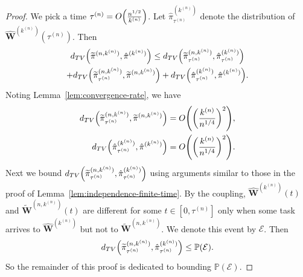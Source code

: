\documentclass[sigconf]{acmart}
\renewcommand{\Pr}{\mathbb{P}} %
\newcommand{\supn}{^{(n)}}
\begin{document}
\begin{proof}
We pick a time $\tau\supn=O\Bigl(\frac{n^{1/2}}{k\supn}\Bigr)$. Let $\hat{\pi}^{(k\supn)}_{\tau\supn}$ denote the distribution of $\hat{\bm{W}}^{(k\supn)}(\tau\supn)$.  Then
\begin{multline*}
d_{TV}\Bigl(\widetilde{\pi}^{(n,k\supn)},\hat{\pi}^{(k\supn)}\Bigr)\le d_{TV}\Bigl(\widetilde{\pi}^{(n,k\supn)}_{\tau\supn},\hat{\pi}^{(k\supn)}_{\tau\supn}\Bigr)\\
+ d_{TV}\Bigl(\widetilde{\pi}^{(n,k\supn)}_{\tau\supn},\widetilde{\pi}^{(n,k\supn)}\Bigr)+d_{TV}\Bigl(\hat{\pi}^{(k\supn)}_{\tau\supn},\hat{\pi}^{(k\supn)}\Bigr).
\end{multline*}
Noting Lemma~\ref{lem:convergence-rate}, we have
\begin{align}
d_{TV}\Bigl(\widetilde{\pi}_{\tau\supn}^{(n,k\supn)},\widetilde{\pi}^{(n,k\supn)}\Bigr)&=O\Biggl(\biggl(\frac{k\supn}{n^{1/4}}\biggr)^2\Biggr),\label{eq:dis1}\\
d_{TV}\Bigl(\hat{\pi}_{\tau\supn}^{(k\supn)},\hat{\pi}^{(k\supn)}\Bigr)&=O\Biggl(\biggl(\frac{k\supn}{n^{1/4}}\biggr)^2\Biggr).\label{eq:dis2}
\end{align}
Next we bound $d_{TV}\Bigl(\widetilde{\pi}^{(n,k\supn)}_{\tau\supn},\hat{\pi}^{(k\supn)}_{\tau\supn}\Bigr)$ using arguments similar to those in the proof of Lemma~\ref{lem:independence-finite-time}. By the coupling, $\hat{\bm{W}}^{(k\supn)}(t)$ and $\widetilde{\bm{W}}^{(n,k\supn)}(t)$ are different for some $t\in[0,\tau\supn]$ only when some task arrives to $\hat{\bm{W}}^{(k\supn)}$ but not to $\widetilde{\bm{W}}^{(n,k\supn)}$. We denote this event by $\mathcal{E}$. Then
\begin{equation*}
d_{TV}\Bigl(\widetilde{\pi}^{(n,k\supn)}_{\tau\supn},\hat{\pi}^{(k\supn)}_{\tau\supn}\Bigr)\le\Pr(\mathcal{E}).
\end{equation*}
So the remainder of this proof is dedicated to bounding $\Pr(\mathcal{E})$.


\end{proof}
\end{document}
